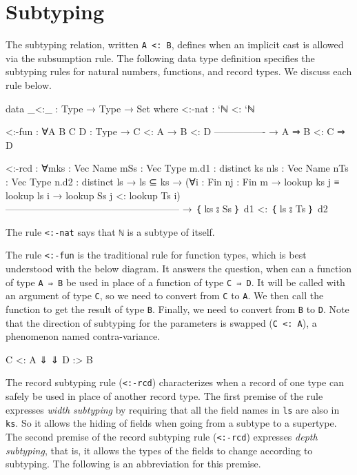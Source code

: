\hypertarget{subtyping}{%
\section{Subtyping}\label{subtyping}}

The subtyping relation, written \texttt{A\ \textless{}:\ B}, defines
when an implicit cast is allowed via the subsumption rule. The following
data type definition specifies the subtyping rules for natural numbers,
functions, and record types. We discuss each rule below.

\begin{fence}
\begin{code}
data _<:_ : Type → Type → Set where
  <:-nat : `ℕ <: `ℕ

  <:-fun : ∀{A B C D : Type}
    → C <: A  → B <: D
      ----------------
    → A ⇒ B <: C ⇒ D

  <:-rcd :  ∀{m}{ks : Vec Name m}{Ss : Vec Type m}.{d1 : distinct ks}
             {n}{ls : Vec Name n}{Ts : Vec Type n}.{d2 : distinct ls}
    → ls ⊆ ks
    → (∀{i : Fin n}{j : Fin m} → lookup ks j ≡ lookup ls i
                               → lookup Ss j <: lookup Ts i)
      ------------------------------------------------------
    → ｛ ks ⦂ Ss ｝ {d1} <: ｛ ls ⦂ Ts ｝ {d2}
\end{code}
\end{fence}

The rule \texttt{\textless{}:-nat} says that \texttt{ℕ} is a subtype of
itself.

The rule \texttt{\textless{}:-fun} is the traditional rule for function
types, which is best understood with the below diagram. It answers the
question, when can a function of type \texttt{A\ ⇒\ B} be used in place
of a function of type \texttt{C\ ⇒\ D}. It will be called with an
argument of type \texttt{C}, so we need to convert from \texttt{C} to
\texttt{A}. We then call the function to get the result of type
\texttt{B}. Finally, we need to convert from \texttt{B} to \texttt{D}.
Note that the direction of subtyping for the parameters is swapped
(\texttt{C\ \textless{}:\ A}), a phenomenon named contra-variance.

\begin{myDisplay}
C <: A
⇓    ⇓
D :> B
\end{myDisplay}

The record subtyping rule (\texttt{\textless{}:-rcd}) characterizes when
a record of one type can safely be used in place of another record type.
The first premise of the rule expresses \emph{width subtyping} by
requiring that all the field names in \texttt{ls} are also in
\texttt{ks}. So it allows the hiding of fields when going from a subtype
to a supertype. The second premise of the record subtyping rule
(\texttt{\textless{}:-rcd}) expresses \emph{depth subtyping}, that is,
it allows the types of the fields to change according to subtyping. The
following is an abbreviation for this premise.

